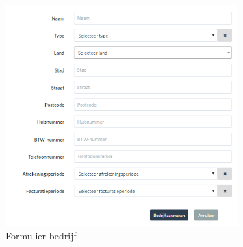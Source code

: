 \documentclass[11pt,openany]{article}
\begin{document}
\begin{figure}
	\centering
	\includegraphics[width=0.8\textwidth]{img/fig14.png}
	\caption{Formulier bedrijf} 
	\label{fig:14} 
\end{figure}
\end{document}
